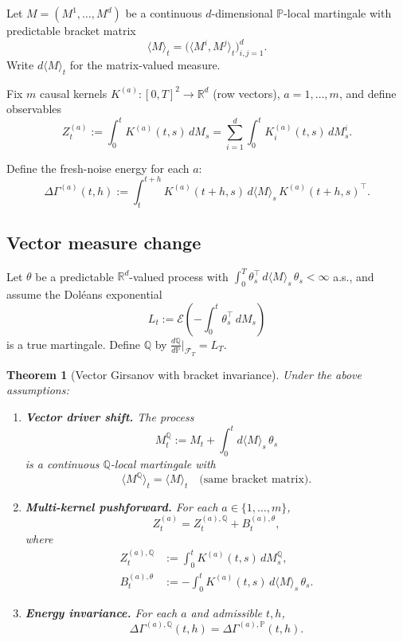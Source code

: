 \documentclass[11pt]{article}
\theoremstyle{plain}
\newtheorem{theorem}{Theorem}[section]
\theoremstyle{definition}
\theoremstyle{remark}
\newcommand{\R}{\mathbb{R}}
\newcommand{\F}{\mathcal{F}}
\newcommand{\PP}{\mathbb{P}}
\newcommand{\QQ}{\mathbb{Q}}
\newcommand{\dGamma}{\Delta\Gamma}
\newcommand{\bracket}[1]{\langle #1 \rangle}
\begin{document}
Let $M = (M^1, \ldots, M^d)$ be a continuous $d$-dimensional $\PP$-local
martingale with predictable bracket matrix
\[
\bracket{M}_t = \big(\bracket{M^i, M^j}_t\big)_{i,j=1}^d.
\]
Write $d\bracket{M}_t$ for the matrix-valued measure.

Fix $m$ causal kernels $K^{(a)} : [0,T]^2 \to \R^d$ (row vectors), $a = 1, \ldots, m$,
and define observables
\[
Z_t^{(a)} := \int_0^t K^{(a)}(t,s)\,dM_s = \sum_{i=1}^d \int_0^t K^{(a)}_i(t,s)\,dM_s^i.
\]

Define the fresh-noise energy for each $a$:
\[
\dGamma^{(a)}(t,h) := \int_t^{t+h} K^{(a)}(t+h,s)\,d\bracket{M}_s\,K^{(a)}(t+h,s)^\top.
\]

\subsection{Vector measure change}

Let $\theta$ be a predictable $\R^d$-valued process with
$\int_0^T \theta_s^\top\,d\bracket{M}_s\,\theta_s < \infty$ a.s., and assume
the Dol\'eans exponential
\[
L_t := \mathcal{E}\left(-\int_0^t \theta_s^\top\,dM_s\right)
\]
is a true martingale. Define $\QQ$ by $\frac{d\QQ}{d\PP}|_{\F_T} = L_T$.

\begin{theorem}[Vector Girsanov with bracket invariance]\label{thm:girsanov-vector}
Under the above assumptions:

\begin{enumerate}[label=(\arabic*)]
\item \textbf{Vector driver shift.} The process
\[
M_t^{\QQ} := M_t + \int_0^t d\bracket{M}_s\,\theta_s
\]
is a continuous $\QQ$-local martingale with
\[
\bracket{M^{\QQ}}_t = \bracket{M}_t \quad \text{(same bracket matrix)}.
\]

\item \textbf{Multi-kernel pushforward.} For each $a \in \{1, \ldots, m\}$,
\begin{equation}\label{eq:Za-decomp}
Z_t^{(a)} = Z_t^{(a),\QQ} + B_t^{(a),\theta},
\end{equation}
where
\begin{align*}
Z_t^{(a),\QQ} &:= \int_0^t K^{(a)}(t,s)\,dM_s^{\QQ}, \\
B_t^{(a),\theta} &:= -\int_0^t K^{(a)}(t,s)\,d\bracket{M}_s\,\theta_s.
\end{align*}

\item \textbf{Energy invariance.} For each $a$ and admissible $t, h$,
\[
\dGamma^{(a),\QQ}(t,h) = \dGamma^{(a),\PP}(t,h).
\]
\end{enumerate}
\end{theorem}
\end{document}
